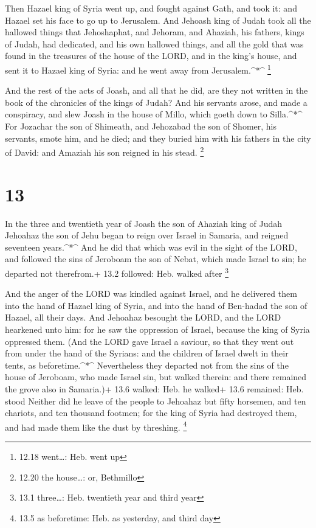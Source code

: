  Then Hazael king of Syria went up, and fought against
Gath, and took it: and Hazael set his face to go up to Jerusalem.
 And Jehoash king of Judah took all the hallowed things
that Jehoshaphat, and Jehoram, and Ahaziah, his fathers, kings of Judah,
had dedicated, and his own hallowed things, and all the gold that was
found in the treasures of the house of the LORD, and in the king's
house, and sent it to Hazael king of Syria: and he went away from
Jerusalem.\^{}*\^{} \footnote{12.18 went\ldots: Heb. went up}

 And the rest of the acts of Joash, and all that he did,
are they not written in the book of the chronicles of the kings of
Judah?  And his servants arose, and made a conspiracy, and
slew Joash in the house of Millo, which goeth down to Silla.\^{}*\^{}
 For Jozachar the son of Shimeath, and Jehozabad the son of
Shomer, his servants, smote him, and he died; and they buried him with
his fathers in the city of David: and Amaziah his son reigned in his
stead. \footnote{12.20 the house\ldots: or, Bethmillo}

\hypertarget{section-12}{%
\section{13}\label{section-12}}

 In the three and twentieth year of Joash the son of Ahaziah
king of Judah Jehoahaz the son of Jehu began to reign over Israel in
Samaria, and reigned seventeen years.\^{}*\^{}  And he did
that which was evil in the sight of the LORD, and followed the sins of
Jeroboam the son of Nebat, which made Israel to sin; he departed not
therefrom.+ 13.2 followed: Heb. walked after \footnote{13.1 three\ldots:
  Heb. twentieth year and third year}

 And the anger of the LORD was kindled against Israel, and
he delivered them into the hand of Hazael king of Syria, and into the
hand of Ben-hadad the son of Hazael, all their days.  And
Jehoahaz besought the LORD, and the LORD hearkened unto him: for he saw
the oppression of Israel, because the king of Syria oppressed them.
 (And the LORD gave Israel a saviour, so that they went out
from under the hand of the Syrians: and the children of Israel dwelt in
their tents, as beforetime.\^{}*\^{}  Nevertheless they
departed not from the sins of the house of Jeroboam, who made Israel
sin, but walked therein: and there remained the grove also in Samaria.)+
13.6 walked: Heb. he walked+ 13.6 remained: Heb. stood 
Neither did he leave of the people to Jehoahaz but fifty horsemen, and
ten chariots, and ten thousand footmen; for the king of Syria had
destroyed them, and had made them like the dust by threshing.
\footnote{13.5 as beforetime: Heb. as yesterday, and third day}

